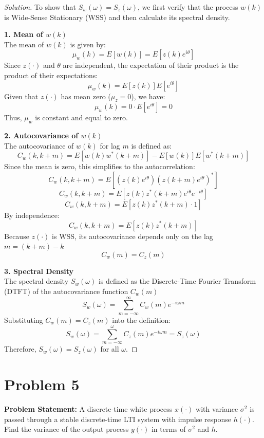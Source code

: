 \documentclass{article}
\begin{document}
\begin{proof}[Solution]
	To show that $S_w(\omega) = S_z(\omega)$, we first verify that the process $w(k)$ is Wide-Sense Stationary (WSS) and then calculate its spectral density.
	
	\textbf{1. Mean of $w(k)$}\\
	The mean of $w(k)$ is given by:
	\[ \mu_w(k) = E[w(k)] = E[z(k)e^{i\theta}] \]
	Since $z(\cdot)$ and $\theta$ are independent, the expectation of their product is the product of their expectations:
	\[ \mu_w(k) = E[z(k)] E[e^{i\theta}] \]
	Given that $z(\cdot)$ has mean zero ($\mu_z = 0$), we have:
	\[ \mu_w(k) = 0 \cdot E[e^{i\theta}] = 0 \]
	Thus, $\mu_w$ is constant and equal to zero.
	
	\textbf{2. Autocovariance of $w(k)$}\\
	The autocovariance of $w(k)$ for lag $m$ is defined as:
	\[ C_w(k, k+m) = E[w(k)w^*(k+m)] - E[w(k)]E[w^*(k+m)] \]
	Since the mean is zero, this simplifies to the autocorrelation:
	\[ C_w(k, k+m) = E[(z(k)e^{i\theta})(z(k+m)e^{i\theta})^*] \]
	\[ C_w(k, k+m) = E[z(k)z^*(k+m) e^{i\theta}e^{-i\theta}] \]
	\[ C_w(k, k+m) = E[z(k)z^*(k+m) \cdot 1] \]
	By independence:
	\[ C_w(k, k+m) = E[z(k)z^*(k+m)] \]
	Because $z(\cdot)$ is WSS, its autocovariance depends only on the lag $m = (k+m) - k$
	\[ C_w(m) = C_z(m) \]
	
	\textbf{3. Spectral Density}\\
	The spectral density $S_w(\omega)$ is defined as the Discrete-Time Fourier Transform (DTFT) of the autocovariance function $C_w(m)$
	\[ S_w(\omega) = \sum_{m=-\infty}^{\infty} C_w(m) e^{-i\omega m} \]
	Substituting $C_w(m) = C_z(m)$ into the definition:
	\[ S_w(\omega) = \sum_{m=-\infty}^{\omega} C_z(m) e^{-i\omega m} = S_z(\omega) \]
	Therefore, $S_w(\omega) = S_z(\omega)$ for all $\omega$.
\end{proof}


\section*{Problem 5}
\textbf{Problem Statement:}
A discrete-time white process $x(\cdot)$ with variance $\sigma^2$ is passed through a stable discrete-time LTI system with impulse response $h(\cdot)$. Find the variance of the output process $y(\cdot)$ in terms of $\sigma^2$ and $h$.
\end{document}
